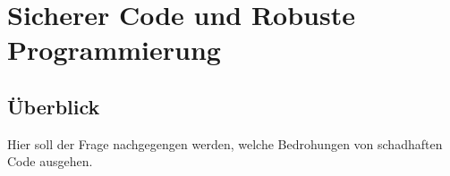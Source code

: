 \section{Sicherer Code und Robuste Programmierung}\label{sicherer_code}

\subsection*{Überblick}\label{ueberblick}
Hier soll der Frage nachgegengen werden, welche Bedrohungen von schadhaften Code ausgehen. 
